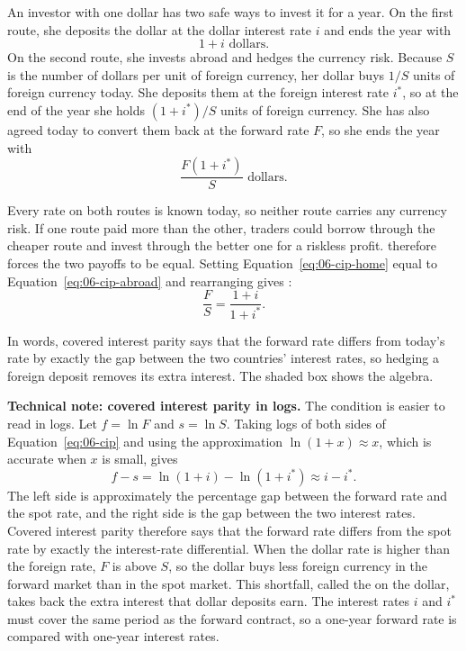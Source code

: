 An investor with one dollar has two safe ways to invest it for a year. On the first route, she deposits the dollar at the dollar interest rate $i$ and ends the year with
\begin{equation}
  1 + i \text{ dollars.}
  \label{eq:06-cip-home}
\end{equation}
On the second route, she invests abroad and hedges the currency risk. Because $S$ is the number of dollars per unit of foreign currency, her dollar buys $1/S$ units of foreign currency today. She deposits them at the foreign interest rate $i^*$, so at the end of the year she holds $(1+i^*)/S$ units of foreign currency. She has also agreed today to convert them back at the forward rate $F$, so she ends the year with
\begin{equation}
  \frac{F(1+i^*)}{S} \text{ dollars.}
  \label{eq:06-cip-abroad}
\end{equation}

Every rate on both routes is known today, so neither route carries any currency risk. If one route paid more than the other, traders could borrow through the cheaper route and invest through the better one for a riskless profit.  therefore forces the two payoffs to be equal. Setting Equation~\eqref{eq:06-cip-home} equal to Equation~\eqref{eq:06-cip-abroad} and rearranging gives :
\begin{equation}
  \frac{F}{S} = \frac{1 + i}{1 + i^*}.
  \label{eq:06-cip}
\end{equation}

In words, covered interest parity says that the forward rate differs from today's rate by exactly the gap between the two countries' interest rates, so hedging a foreign deposit removes its extra interest. The shaded box shows the algebra.

\begin{technote}
\textbf{Technical note: covered interest parity in logs.} The condition is easier to read in logs. Let $f = \ln F$ and $s = \ln S$. Taking logs of both sides of Equation~\eqref{eq:06-cip} and using the approximation $\ln(1+x) \approx x$, which is accurate when $x$ is small, gives
\begin{equation}
  f - s = \ln(1+i) - \ln(1+i^*) \approx i - i^*.
  \label{eq:06-cip-log}
\end{equation}
The left side is approximately the percentage gap between the forward rate and the spot rate, and the right side is the gap between the two interest rates. Covered interest parity therefore says that the forward rate differs from the spot rate by exactly the interest-rate differential. When the dollar rate is higher than the foreign rate, $F$ is above $S$, so the dollar buys less foreign currency in the forward market than in the spot market. This shortfall, called the  on the dollar, takes back the extra interest that dollar deposits earn. The interest rates $i$ and $i^*$ must cover the same period as the forward contract, so a one-year forward rate is compared with one-year interest rates.
\end{technote}


